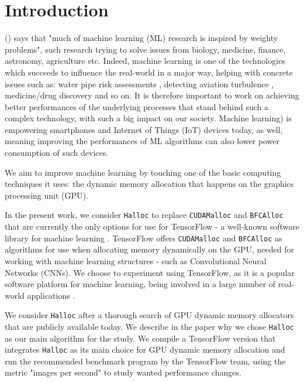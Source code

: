 \documentclass[12pt,twoside]{article}
\begin{document}

\section{Introduction}
\label{sec:introduction}

\citeauthor{mach-learning-matters} (\citeyear{mach-learning-matters}) \cite{mach-learning-matters} says that "much of machine learning (ML) research is inspired by weighty problems", such research trying to solve issues from biology, medicine, finance, astronomy, agriculture etc. Indeed, machine learning  is one of the technologies which succeeds to influence the real-world in a major way, helping with concrete issues such as: water pipe risk assessments \cite{water-pipe-risk}, detecting aviation turbulence \cite{aviation-turbulence}, medicine/drug discovery \cite{drug-discovery} and so on. It is therefore important to work on achieving better performances of the underlying processes that stand behind such a complex technology, with such a big impact on our society. Machine learning) is empowering smartphones \cite{google-visual-core} and Internet of Things (IoT) devices \cite{visual-core-iot} today, as well, meaning improving the performances of ML algorithms can also lower power consumption of such devices.

We aim to improve machine learning by touching one of the basic computing techniques it uses: the dynamic memory allocation that happens on the graphics processing unit (GPU). 

In the present work, we consider \texttt{Halloc} \cite{halloc-paper} to replace \texttt{CUDAMalloc} and \texttt{BFCAlloc} that are currently the only options for use for TensorFlow - a well-known software library for machine learning \cite{TensorFlow-main-paper}. TensorFlow offers \texttt{CUDAMalloc} and \texttt{BFCAlloc} as algorithms for use when allocating memory dynamically on the GPU, needed for working with machine learning structures - such as Convolutional Neural Networks (CNNs). We choose to experiment using TensorFlow, as it is a popular software platform for machine learning, being involved in a large number of real-world applications \cite{drug-discovery} \cite{brain-tumor-detection} \cite{security-system}. 

We consider \texttt{Halloc} after a thorough search of GPU dynamic memory allocators that are publicly available today. We describe in the paper why we chose \texttt{Halloc} as our main algorithm for the study. We compile a TensorFlow version that integrates \texttt{Halloc} as its main choice for GPU dynamic memory allocation and run the recommended benchmark program by the TensorFlow team, using the metric "images per second" to study wanted performance changes.
\end{document}
